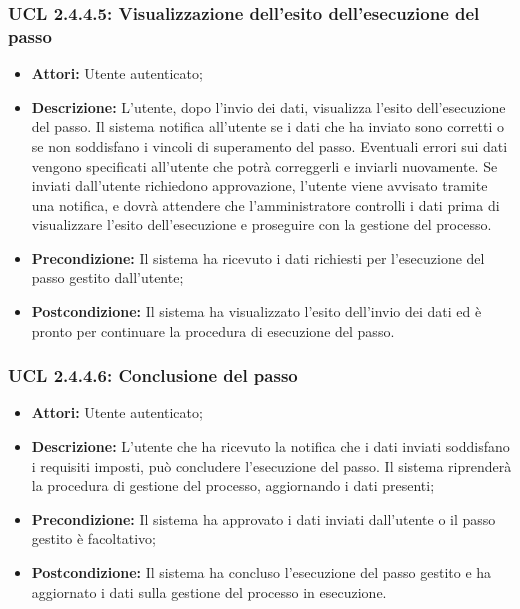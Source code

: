 \subsubsection{UCL 2.4.4.5: Visualizzazione dell'esito dell'esecuzione del passo}
\begin{itemize}
\item \textbf{Attori:} Utente autenticato;
\item \textbf{Descrizione:} L'utente, dopo l'invio dei dati, visualizza l'esito dell'esecuzione del passo. Il sistema notifica all'utente se i dati che ha inviato sono corretti o se non soddisfano i vincoli di superamento del passo.
Eventuali errori sui dati vengono specificati all'utente che potrà correggerli e inviarli nuovamente.
Se inviati dall'utente richiedono approvazione, l'utente viene avvisato tramite una notifica, e dovrà attendere che l'amministratore controlli i dati prima di visualizzare l'esito dell'esecuzione e proseguire con la gestione del processo.
\item \textbf{Precondizione:} Il sistema ha ricevuto i dati richiesti per l'esecuzione del passo gestito dall'utente;
\item \textbf{Postcondizione:} Il sistema ha visualizzato l'esito dell'invio dei dati ed è pronto per continuare la procedura di esecuzione del passo.
\end{itemize}

\hypertarget{L2.4.4.6}{}
\subsubsection{UCL 2.4.4.6: Conclusione del passo}
\begin{itemize}
\item \textbf{Attori:} Utente autenticato;
\item \textbf{Descrizione:} L'utente che ha ricevuto la notifica che i dati inviati soddisfano i requisiti imposti, può concludere l'esecuzione del passo. Il sistema riprenderà la procedura di gestione del processo, aggiornando i dati presenti;
\item \textbf{Precondizione:} Il sistema ha approvato i dati inviati dall'utente o il passo gestito è facoltativo;
\item \textbf{Postcondizione:} Il sistema ha concluso l'esecuzione del passo gestito e ha aggiornato i dati sulla gestione del processo in esecuzione.
\end{itemize}

